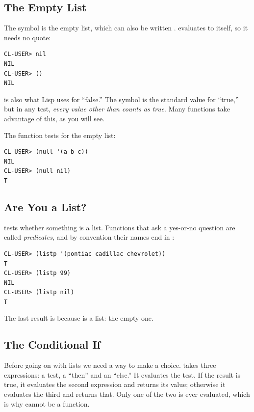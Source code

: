 \subsection{The Empty List}

The symbol  is the empty list, which can also be written
\code{()}.  evaluates to itself, so it needs no quote:

\begin{verbatim}
CL-USER> nil
NIL
CL-USER> ()
NIL
\end{verbatim}

 is also what Lisp uses for ``false.'' The symbol
 is the standard value for ``true,'' but in any test,
\emph{every value other than  counts as true}. Many
functions take advantage of this, as you will see.

The function  tests for the empty list:

\begin{verbatim}
CL-USER> (null '(a b c))
NIL
CL-USER> (null nil)
T
\end{verbatim}

\subsection{Are You a List?}

 tests whether something is a list. Functions that ask a
yes-or-no question are called \emph{predicates}, and by convention
their names end in :

\begin{verbatim}
CL-USER> (listp '(pontiac cadillac chevrolet))
T
CL-USER> (listp 99)
NIL
CL-USER> (listp nil)
T
\end{verbatim}

The last result is  because  is a list: the empty
one.

\subsection{The Conditional If}

Before going on with lists we need a way to make a choice.
 takes three expressions: a test, a ``then'' and an ``else.''
It evaluates the test. If the result is true, it evaluates the
second expression and returns its value; otherwise it evaluates the
third and returns that. Only one of the two is ever evaluated, which
is why  cannot be a function.

